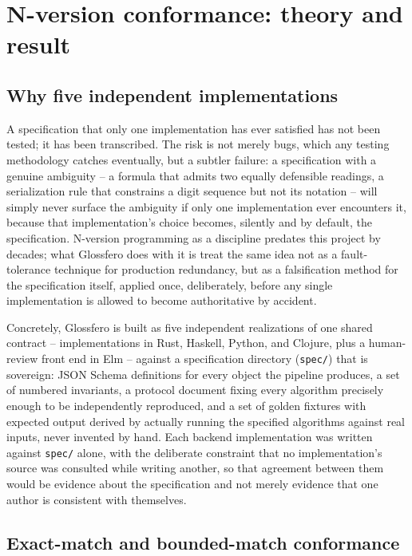 \documentclass[11pt]{article}
\begin{document}
\section{N-version conformance: theory and result}

\subsection{Why five independent implementations}

A specification that only one implementation has ever satisfied has not been tested; it has been transcribed. The risk is not merely bugs, which any testing methodology catches eventually, but a subtler failure: a specification with a genuine ambiguity -- a formula that admits two equally defensible readings, a serialization rule that constrains a digit sequence but not its notation -- will simply never surface the ambiguity if only one implementation ever encounters it, because that implementation's choice becomes, silently and by default, the specification. N-version programming as a discipline predates this project by decades; what Glossfero does with it is treat the same idea not as a fault-tolerance technique for production redundancy, but as a falsification method for the specification itself, applied once, deliberately, before any single implementation is allowed to become authoritative by accident.

Concretely, Glossfero is built as five independent realizations of one shared contract -- implementations in Rust, Haskell, Python, and Clojure, plus a human-review front end in Elm -- against a specification directory (\texttt{spec/}) that is sovereign: JSON Schema definitions for every object the pipeline produces, a set of numbered invariants, a protocol document fixing every algorithm precisely enough to be independently reproduced, and a set of golden fixtures with expected output derived by actually running the specified algorithms against real inputs, never invented by hand. Each backend implementation was written against \texttt{spec/} alone, with the deliberate constraint that no implementation's source was consulted while writing another, so that agreement between them would be evidence about the specification and not merely evidence that one author is consistent with themselves.

\subsection{Exact-match and bounded-match conformance}
\end{document}
